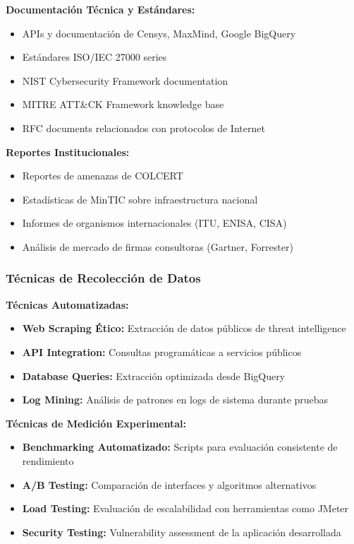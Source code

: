 \textbf{Documentación Técnica y Estándares:}
\begin{itemize}
    \item APIs y documentación de Censys, MaxMind, Google BigQuery
    \item Estándares ISO/IEC 27000 series
    \item NIST Cybersecurity Framework documentation
    \item MITRE ATT\&CK Framework knowledge base
    \item RFC documents relacionados con protocolos de Internet
\end{itemize}

\textbf{Reportes Institucionales:}
\begin{itemize}
    \item Reportes de amenazas de COLCERT
    \item Estadísticas de MinTIC sobre infraestructura nacional
    \item Informes de organismos internacionales (ITU, ENISA, CISA)
    \item Análisis de mercado de firmas consultoras (Gartner, Forrester)
\end{itemize}

\subsubsection{Técnicas de Recolección de Datos}

\textbf{Técnicas Automatizadas:}
\begin{itemize}
    \item \textbf{Web Scraping Ético:} Extracción de datos públicos de threat intelligence
    \item \textbf{API Integration:} Consultas programáticas a servicios públicos
    \item \textbf{Database Queries:} Extracción optimizada desde BigQuery
    \item \textbf{Log Mining:} Análisis de patrones en logs de sistema durante pruebas
\end{itemize}

\textbf{Técnicas de Medición Experimental:}
\begin{itemize}
    \item \textbf{Benchmarking Automatizado:} Scripts para evaluación consistente de rendimiento
    \item \textbf{A/B Testing:} Comparación de interfaces y algoritmos alternativos
    \item \textbf{Load Testing:} Evaluación de escalabilidad con herramientas como JMeter
    \item \textbf{Security Testing:} Vulnerability assessment de la aplicación desarrollada
\end{itemize}

